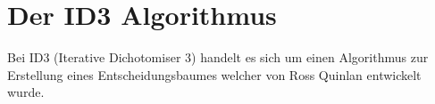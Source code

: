 \chapter{Der ID3 Algorithmus}
\label{id3}
Bei ID3 (Iterative Dichotomiser 3) handelt es sich um einen Algorithmus zur Erstellung eines Entscheidungsbaumes welcher von Ross Quinlan entwickelt wurde. \Autocite{QuinlanID3} 





